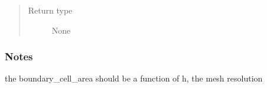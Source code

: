 \documentclass[letterpaper,10pt,english]{sphinxmanual}
\begin{document}
\begin{fulllineitems}
\begin{fulllineitems}
\begin{quote}
\begin{description}
\item[{Return type}] \leavevmode
None

\end{description}\end{quote}
\subsubsection*{Notes}

the boundary\_cell\_area should be a function of h, the mesh resolution

\end{fulllineitems}


\end{fulllineitems}

\end{document}
